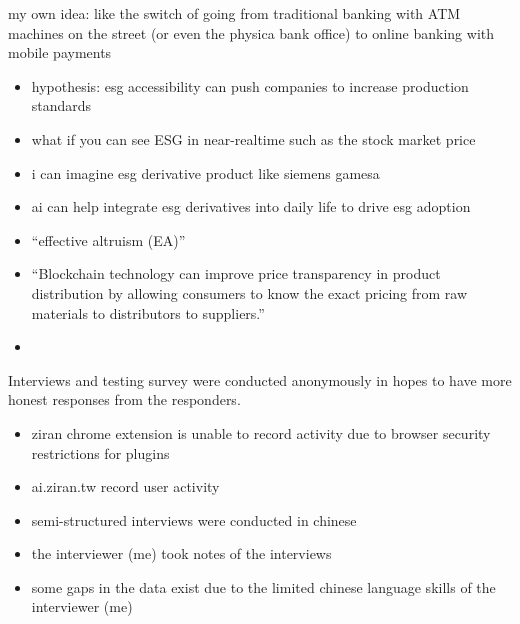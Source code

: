 \documentclass[
  letterpaper,
  DIV=11,
  numbers=noendperiod]{scrartcl}
\providecommand{\tightlist}{%
  \setlength{\itemsep}{0pt}\setlength{\parskip}{0pt}}\usepackage{longtable,booktabs,array}
\begin{document}
my own idea: like the switch of going from traditional banking with ATM
machines on the street (or even the physica bank office) to online
banking with mobile payments

\begin{itemize}
\item
  hypothesis: esg accessibility can push companies to increase
  production standards
\item
  what if you can see ESG in near-realtime such as the stock market
  price
\item
  i can imagine esg derivative product like siemens gamesa
\item
  ai can help integrate esg derivatives into daily life to drive esg
  adoption
\item
  ``effective altruism (EA)''
\item
  ``Blockchain technology can improve price transparency in product
  distribution by allowing consumers to know the exact pricing from raw
  materials to distributors to suppliers.''
\item
\end{itemize}

Interviews and testing survey were conducted anonymously in hopes to
have more honest responses from the responders.

\begin{itemize}
\tightlist
\item
  ziran chrome extension is unable to record activity due to browser
  security restrictions for plugins
\item
  ai.ziran.tw record user activity
\item
  semi-structured interviews were conducted in chinese
\item
  the interviewer (me) took notes of the interviews
\item
  some gaps in the data exist due to the limited chinese language skills
  of the interviewer (me)
\end{itemize}
\end{document}

